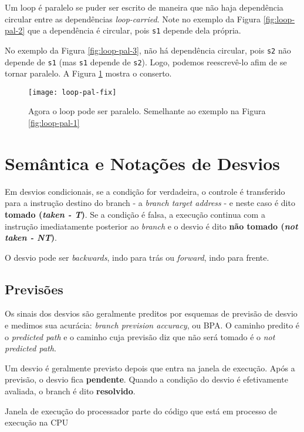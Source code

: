 Um loop é paralelo se puder ser escrito de maneira que não haja dependência circular entre as dependências \textit{loop-carried}. Note no exemplo da Figura \ref{fig:loop-pal-2} que a dependência é circular, pois \texttt{s1} depende dela própria.

No exemplo da Figura \ref{fig:loop-pal-3}, não há dependência circular, pois \texttt{s2} não depende de \texttt{s1} (mas \texttt{s1} depende de \texttt{s2}). Logo, podemos reescrevê-lo afim de se tornar paralelo. A Figura \ref{fig:loop-pal-fix} mostra o conserto.

\begin{figure}[ht]
  \centering
  \texttt{[image: loop-pal-fix]}
  \caption{Agora o loop pode ser paralelo. Semelhante ao exemplo na Figura \ref{fig:loop-pal-1}}
  \label{fig:loop-pal-fix}
\end{figure}






\section{Semântica e Notações de Desvios}
Em desvios condicionais, se a condição for verdadeira, o controle é transferido para a instrução destino do branch - a \textit{branch target address} - e neste caso é dito \textbf{tomado (\textit{taken - T})}. Se a condição é falsa, a execução continua com a instrução imediatamente posterior ao \textit{branch} e o desvio é dito \textbf{não tomado (\textit{not taken - NT})}.

O desvio pode ser \textit{backwards}, indo para trás ou \textit{forward}, indo para frente.



\subsection{Previsões}
Os sinais dos desvios são geralmente preditos por esquemas de previsão de desvio e medimos sua acurácia: \textit{branch prevision accuracy}, ou BPA. O caminho predito é o \textit{predicted path} e o caminho cuja previsão diz que não será tomado é o \textit{not predicted path}.

Um desvio é geralmente previsto depois que entra na janela de execução. Após a previsão, o desvio fica \textbf{pendente}. Quando a condição do desvio é efetivamente avaliada, o branch é dito \textbf{resolvido}.

\begin{definicao}{Janela de execução do processador}
  parte do código que está em processo de execução na CPU
\end{definicao}

